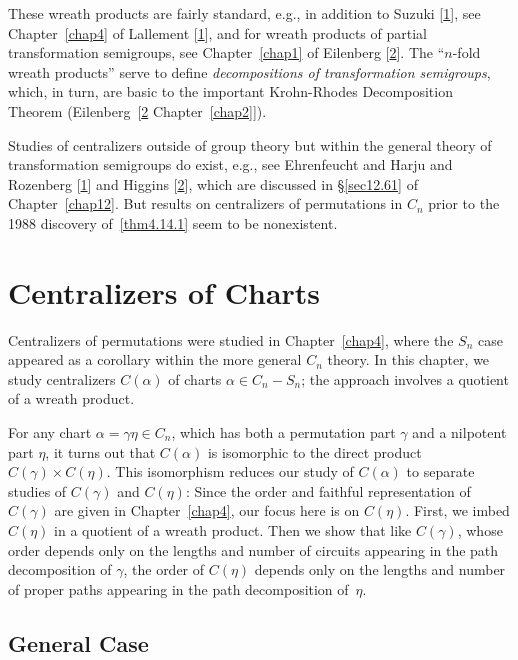 \documentclass{surv-l}
\numberwithin{equation}{section}
\numberwithin{table}{section}
\numberwithin{figure}{section}
\theoremstyle{definition}
\begin{document}
These wreath products are fairly standard, e.g., in addition to
Suzuki [\hyperlink{bib74}{1}], see
Chapter~\ref{chap4} of Lallement
[\hyperlink{bib38}{1}], and for wreath products of
partial transformation semigroups, see Chapter~\ref{chap1} of
Eilenberg [\hyperlink{bib14a}{2}]. The ``$n$-fold wreath
products'' serve to define \emph{decompositions of transformation
semigroups}, which, in turn, are basic to the important
Krohn-Rhodes Decomposition Theorem
(Eilenberg~[\hyperlink{bib14a}{2} Chapter~\ref{chap2}]).

Studies of centralizers outside of group theory but within the
general theory of transformation semigroups do exist, e.g., see
Ehrenfeucht and Harju and Rozenberg
[\hyperlink{bib13}{1}] and Higgins
[\hyperlink{bib28}{2}], which are discussed in
\S\ref{sec12.61} of Chapter~\ref{chap12}. But results on
centralizers of permutations in $C_{n}$ prior to the 1988
discovery of~\ref{thm4.14.1} seem to be nonexistent.

\chapter{Centralizers of Charts}\label{chap5}

Centralizers of permutations were studied in Chapter~\ref{chap4},
where the $S_{n}$ case appeared as a corollary within the more
general $C_{n}$ theory. In this
chapter, we study centralizers
$C(\alpha)$ of charts $\alpha\in C_{n}-S_{n}$; the approach
involves a quotient of a wreath product.

For any chart $\alpha=\gamma\eta\in C_{n}$, which has both a
permutation part $\gamma$ and a nilpotent part $\eta$, it turns
out that $C(\alpha)$ is isomorphic to the direct product
$C(\gamma)\times C(\eta)$. This isomorphism reduces our study of
$C(\alpha)$ to separate studies of $C(\gamma)$ and $C(\eta)$:
Since the order and faithful representation of $C(\gamma)$ are
given in Chapter~\ref{chap4}, our focus here is on $C(\eta)$.
First, we imbed $C(\eta)$ in a quotient of a wreath product. Then
we show that like $C(\gamma)$, whose order depends only on the
lengths and number of circuits appearing in the path decomposition
of $\gamma$, the order of $C(\eta)$ depends only on the lengths
and number of proper paths appearing in the path decomposition
of~$\eta$.

\setcounter{section}{15}

\section{General Case}\label{sec4.16}
\end{document}
